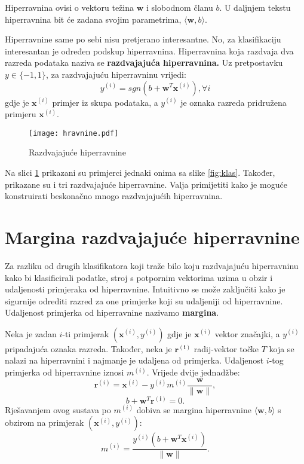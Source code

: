 \documentclass[times, utf8, zavrsni, numeric]{fer}
\newcommand{\hiperravnina}{$\langle \mathbf{w}, b \rangle$}
\begin{document}
Hiperravnina ovisi o vektoru težina $\mathbf{w}$ i slobodnom članu $b$. 
U daljnjem tekstu hiperravnina bit će zadana svojim parametrima, \hiperravnina{}. 

\par Hiperravnine same po sebi nisu pretjerano interesantne. 
No, za klasifikaciju interesantan je određen podskup hiperravnina.
Hiperravnina koja razdvaja dva razreda podataka naziva se \textbf{razdvajajuća hiperravnina.}
Uz pretpostavku $y \in \{-1, 1\}$, za razdvajajuću hiperravninu vrijedi:
\begin{equation}
  y^{(i)} = sgn(b + \mathbf{w}^T\mathbf{x}^{(i)}), \forall i
\end{equation}
gdje je $\mathbf{x}^{(i)}$ primjer iz skupa podataka, a $y^{(i)}$ je oznaka razreda pridružena primjeru $\mathbf{x}^{(i)}$.

\begin{figure}
\centering
\texttt{[image: hravnine.pdf]}
\caption{Razdvajajuće hiperravnine}
\label{fig:hrav}
\end{figure}

Na slici \ref{fig:hrav} prikazani su primjerci jednaki onima sa slike \ref{fig:klas}.
Također, prikazane su i tri razdvajajuće hiperravnine. 
Valja primijetiti kako je moguće konstruirati beskonačno mnogo razdvajajućih hiperravnina.

\section{Margina razdvajajuće hiperravnine} \label{margina}
Za razliku od drugih klasifikatora koji traže bilo koju razdvajajuću hiperravninu kako bi klasificirali podatke,
stroj s potpornim vektorima uzima u obzir i udaljenosti primjeraka od hiperravnine. 
Intuitivno se može zaključiti kako je sigurnije odrediti razred za one primjerke koji su udaljeniji od 
hiperravnine. Udaljenost primjerka od hiperravnine nazivamo \textbf{margina}.

\par Neka je zadan $i$-ti primjerak $(\mathbf{x}^{(i)}, y^{(i)})$ gdje je $\mathbf{x}^{(i)}$ vektor značajki, 
a $y^{(i)}$ pripadajuća oznaka razreda.
Također, neka je $\mathbf{r^{(i)}}$ radij-vektor točke $T$ koja se nalazi na hiperravnini i najmanje je udaljena od primjerka. 
Udaljenost $i$-tog primjerka od hiperravnine iznosi $m^{(i)}$. 
Vrijede dvije jednadžbe:
$$\mathbf{r}^{(i)} = \mathbf{x}^{(i)} - y^{(i)}m^{(i)}\frac{\mathbf{w}}{\|\mathbf{w}\|},$$
$$b + \mathbf{w}^T\mathbf{r^{(i)}} = 0.$$
Rješavanjem ovog sustava po $m^{(i)}$ dobiva se margina hiperravnine \hiperravnina{}
s obzirom na primjerak $(\mathbf{x}^{(i)}, y^{(i)})$:
\begin{equation}
  m^{(i)} = \frac{y^{(i)}(b + \mathbf{w}^T\mathbf{x}^{(i)})}{\|\mathbf{w}\|}.
  \label{eq:marg}
\end{equation}
\end{document}

